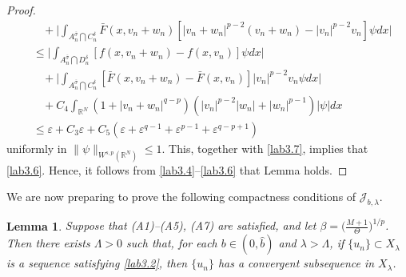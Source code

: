 \documentclass[10pt,a4paper]{amsart}
\numberwithin{equation}{section}
\newtheorem{lemma}[theorem]{Lemma}
\begin{document}
\begin{proof}
\begin{align*}
&\ \ \ \ +\Big|\int_{A^{\bar{\sigma}}_n\bigcap C^\delta_n} \bar{F}(x,v_n+w_n)[|v_n+w_n|^{p-2}(v_n+w_n)-|v_n|^{p-2}v_n]\psi dx\Big|   \\
&\leq\Big|\int_{A^{\bar{\sigma}}_n\bigcap D^\delta_n} [f(x,v_n+w_n)-f(x,v_n)]\psi dx\Big|   \\
&\ \ \ \ +\Big|\int_{A^{\bar{\sigma}}_n\bigcap C^\delta_n} [\bar{F}(x,v_n+w_n)-\bar{F}(x,v_n)]|v_n|^{p-2}v_n\psi dx\Big|   \\
&\ \ \ \ +C_4\int_{\mathbb{R}^N} (1+|v_n+w_n|^{q-p})(|v_n|^{p-2}|w_n|+|w_n|^{p-1})|\psi| dx   \\
&\leq \varepsilon+C_3\varepsilon+C_5(\varepsilon+\varepsilon^{q-1}+\varepsilon^{p-1}+\varepsilon^{q-p+1})
\end{align*}
uniformly in $\|\psi\|_{W^{s,p}(\mathbb{R}^N)}\leq1$. 
This, together with \eqref{lab3.7}, implies that \eqref{lab3.6}.  Hence, it follows 
from \eqref{lab3.4}--\eqref{lab3.6} that Lemma holds.
\end{proof}

We are now preparing to prove the following compactness conditions of 
$\mathcal{J}_{b,\lambda}$.

\begin{lemma}\label{L3.7}
Suppose that {\rm (A1)--(A5), (A7)} are satisfied, and let
$\beta=\big(\frac{M+1}{\Theta}\big)^{1/p}$. Then there exists $\Lambda>0$
such that, for each $b\in(0, \widehat{b})$ and $\lambda>\Lambda$, 
if $\{u_n\}\subset X_\lambda$ is a sequence satisfying \eqref{lab3.2}, 
then $\{u_n\}$ has a convergent subsequence in $X_\lambda$.
\end{lemma}
\end{document}
